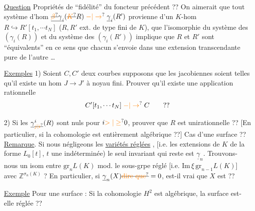 \uline{Question}  Propriétés de ``fidélité'' du foncteur précédent ?? On aimerait que tout  système d'hom $\underline{\deleted{\unsure{\beta}}\gamma}_i(\deleted{\unsure{K}}R)\mathrel{\unsure{-|\to}}\underline{\gamma}_i(R')$
provienne d'un $K$-hom $R\mathrel{\hookrightarrow}R'[t_1,\dotsb t_N]$ ($R,R'$ ext. de type fini de $K$), que l'isomorphie du système des $(\gamma_i(R))$ et du système des $(\gamma_i(R'))$ implique que $R$ et $R'$ sont ``équivalents'' en ce sens que chacun s'envoie dans une extension transcendante pure de l'autre \dots

\uline{Exemples} 1) Soient $C,C'$ deux courbes   supposons que les jacobiennes soient telles qu'il existe un hom $J\longrightarrow J'$ à noyau fini. Prouver qu'il existe  une application rationnelle 
\[
C'[t_1,\dotsb t_N]\mathrel{\unsure{-|\to}}C\qquad??
\]

2) Si les $\underline{\gamma}^{i}_{\deleted{\unsure{j|i}}}(R)$ sont nuls pour $i\unsure{>| \geq}0$, prouver que $R$ est unirationnelle ?? [En particulier, si la cohomologie  est entièrement algébrique ??] Cas d'une surface ?? \inserted{[cl. alg. !]}
\uline{Remarque}. Si nous négligeons les \uline{variétés réglées} , [i.e. les extensions  de $K$ de  la forme $L_0[t]$, $t$ une indéterminée) le seul invariant  qui reste est $\underline{\gamma}_n$. Trouvons-nous un isom entre $\mathrm{gr}_n L(K)$ mod. le sous-grpe réglé [i.e. $\mathrm{Im}\,\xi\,\mathrm{gr}_{n-1}L(K)$] avec $\mathbb Z^{\sigma_n(K)}$ ? En particulier, si $\underline{\gamma}_n(X)\deleted{\text{\unsure{dire que}}}=0$, est-il vrai que $X$ est  ??

\uline{Exemple} Pour une surface : Si la cohomologie $H^2$ est algébrique, la surface est-elle réglée ??

